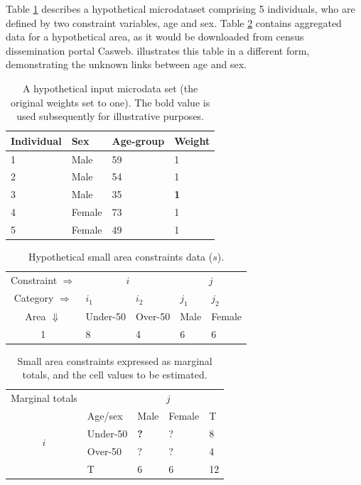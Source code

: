 \documentclass[a4paper,10pt]{article}
\begin{document}
Table \ref{t:w}  describes a
hypothetical microdataset comprising 5 individuals, who are defined by two
constraint variables, age and sex. 
Table \ref{t:s} contains aggregated data
for a hypothetical area, as it would be downloaded from census dissemination
portal Casweb.  illustrates this table in a different form,
demonstrating the unknown links between age and sex.

\begin{table}[h]
\centering
\caption[A hypothetical input microdata set]{A
hypothetical input microdata set (the original
weights set to one). The bold value is used subsequently for
illustrative purposes.}
\begin{tabular}{llll}
\toprule
{Individual } & {Sex} & {Age-group} & {Weight} \\
\midrule
1 & Male & 59 & 1 \\
2 & Male & 54 & 1 \\
3 & {Male} & {35} & \textbf{1} \\
4 & Female & 73 & 1 \\
5 & Female & 49 & 1 \\
\bottomrule
\end{tabular}
\label{t:w}
\end{table}
\vspace{1cm}


\begin{table}[htbp]
\centering
\caption{Hypothetical small area constraints data ($s$).}
\begin{tabular}{cllll}
\toprule
Constraint $\Rightarrow$ & \multicolumn{2}{c}{$i$}& \multicolumn{2}{c}{$j$}\\
Category $\Rightarrow$ & $i_1$ & $i_2$ & $j_1$ & $j_2$ \\
Area $\Downarrow$  & Under-50 & Over-50 &  Male & Female\\
1  & 8 & 4 & 6 & 6\\
\bottomrule
\end{tabular}
\label{t:s}
\end{table}
\vspace{1cm}

\begin{table}[htbp]
\centering
\caption[Small area constraints expressed as marginal totals]{Small
area constraints expressed as marginal totals, and the cell
values to be estimated.}
\begin{tabular}{cllll}\toprule
Marginal totals&  & \multicolumn{2}{c}{$j$} & \\
& Age/sex & Male & Female & T\\ \midrule
\multirow{2}{*}{$i$} & Under-50 & \textbf{?} & ? & 8\\
& Over-50 & ? & ? &4 \\
& T & 6 & 6 &12\\
\bottomrule
\end{tabular}
\label{t:s2}
\end{table}
\end{document}
